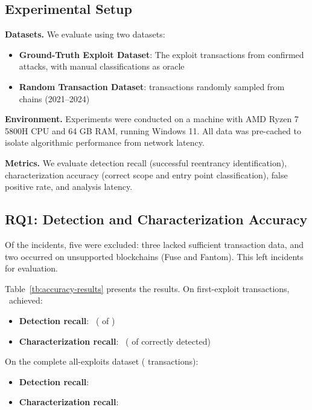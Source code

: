\subsection{Experimental Setup}

\textbf{Datasets.} We evaluate using two datasets:
\begin{itemize}
    \item \textbf{Ground-Truth Exploit Dataset}: The  exploit transactions from  confirmed attacks, with manual classifications as oracle
    \item \textbf{Random Transaction Dataset}:  transactions randomly sampled from  chains (2021--2024)
\end{itemize}

\textbf{Environment.} Experiments were conducted on a machine with AMD Ryzen 7 5800H CPU and 64 GB RAM, running Windows 11. All data was pre-cached to isolate algorithmic performance from network latency.

\textbf{Metrics.} We evaluate detection recall (successful reentrancy identification), characterization accuracy (correct scope and entry point classification), false positive rate, and analysis latency.

\subsection{RQ1: Detection and Characterization Accuracy}

Of the  incidents, five were excluded: three lacked sufficient transaction data, and two occurred on unsupported blockchains (Fuse and Fantom). This left  incidents for evaluation.



Table~\ref{tb:accuracy-results} presents the results. On first-exploit transactions, \ToolName\ achieved:
\begin{itemize}
    \item \textbf{Detection recall}: \FirstRecall\ ( of )
    \item \textbf{Characterization recall}: \FirstCategorizationRecall\ ( of  correctly detected)
\end{itemize}

On the complete all-exploits dataset ( transactions):
\begin{itemize}
    \item \textbf{Detection recall}: \AllRecall
    \item \textbf{Characterization recall}: \AllCategorizationRecall
\end{itemize}

